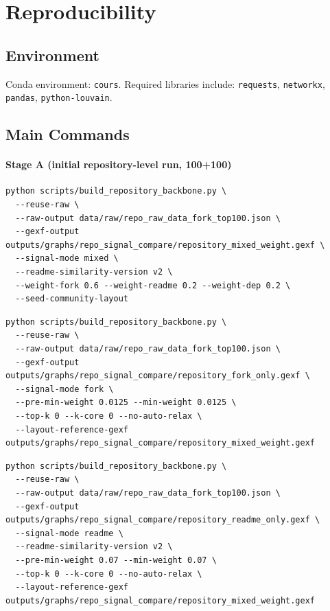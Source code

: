 \documentclass[11pt]{article}
\begin{document}
\section{Reproducibility}
\subsection{Environment}
Conda environment: \texttt{cours}. Required libraries include:
\texttt{requests}, \texttt{networkx}, \texttt{pandas}, \texttt{python-louvain}.

\subsection{Main Commands}
\paragraph{Stage A (initial repository-level run, 100+100)}
\begin{verbatim}
python scripts/build_repository_backbone.py \
  --reuse-raw \
  --raw-output data/raw/repo_raw_data_fork_top100.json \
  --gexf-output outputs/graphs/repo_signal_compare/repository_mixed_weight.gexf \
  --signal-mode mixed \
  --readme-similarity-version v2 \
  --weight-fork 0.6 --weight-readme 0.2 --weight-dep 0.2 \
  --seed-community-layout
\end{verbatim}

\begin{verbatim}
python scripts/build_repository_backbone.py \
  --reuse-raw \
  --raw-output data/raw/repo_raw_data_fork_top100.json \
  --gexf-output outputs/graphs/repo_signal_compare/repository_fork_only.gexf \
  --signal-mode fork \
  --pre-min-weight 0.0125 --min-weight 0.0125 \
  --top-k 0 --k-core 0 --no-auto-relax \
  --layout-reference-gexf outputs/graphs/repo_signal_compare/repository_mixed_weight.gexf
\end{verbatim}

\begin{verbatim}
python scripts/build_repository_backbone.py \
  --reuse-raw \
  --raw-output data/raw/repo_raw_data_fork_top100.json \
  --gexf-output outputs/graphs/repo_signal_compare/repository_readme_only.gexf \
  --signal-mode readme \
  --readme-similarity-version v2 \
  --pre-min-weight 0.07 --min-weight 0.07 \
  --top-k 0 --k-core 0 --no-auto-relax \
  --layout-reference-gexf outputs/graphs/repo_signal_compare/repository_mixed_weight.gexf
\end{verbatim}
\end{document}
